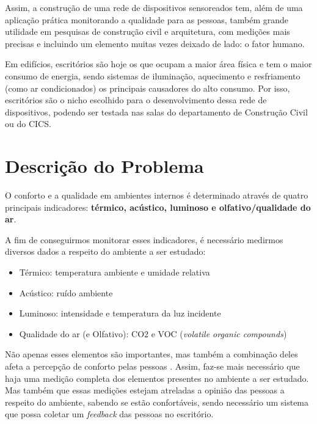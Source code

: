\documentclass[]{politex}
\begin{document}
Assim, a construção de uma rede de dispositivos sensoreados tem, além de uma aplicação prática monitorando a qualidade para as pessoas, também grande utilidade em pesquisas de construção civil e arquitetura, com medições mais precisas e incluindo um elemento muitas vezes deixado de lado: o fator humano. 

Em edifícios, escritórios são hoje os que ocupam a maior área física e tem o maior consumo de energia, sendo sistemas de iluminação, aquecimento e resfriamento (como ar condicionados) os principais causadores do alto consumo\cite{EnergyBuildings}. Por isso, escritórios são o nicho escolhido para o desenvolvimento dessa rede de dispositivos, podendo ser testada nas salas do departamento de Construção Civil ou do CICS. 



\chapter{Descrição do Problema} %

O conforto e a qualidade em ambientes internos é determinado através de quatro principais indicadores: \textbf{térmico, acústico, luminoso e olfativo/qualidade do ar}\cite{ComfortBox}. 

A fim de conseguirmos monitorar esses indicadores, é necessário medirmos diversos dados a respeito do ambiente a ser estudado: %
\begin{itemize}
\item Térmico: temperatura ambiente e umidade relativa
\item Acústico: ruído ambiente
\item Luminoso: intensidade e temperatura da luz incidente
\item Qualidade do ar (e Olfativo): CO2 e VOC (\textit{volatile organic compounds})
\end{itemize}

Não apenas esses elementos são importantes, mas também a combinação deles afeta a percepção de conforto pelas pessoas \cite{ComfortOffice}. Assim, faz-se mais necessário que haja uma medição completa dos elementos presentes no ambiente a ser estudado. Mas também que essas medições estejam atreladas a opinião das pessoas a respeito do ambiente, sabendo se estão confortáveis, sendo necessário um sistema que possa coletar um \textit{feedback} das pessoas no escritório. 
\end{document}
